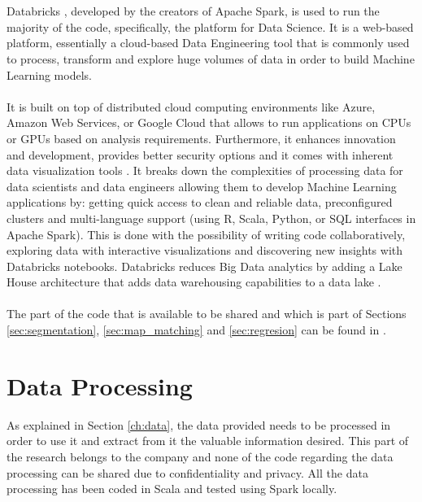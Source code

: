 \\
\\
Databricks \cite{databricks1}, developed by the creators of Apache Spark, is used to run the majority of the code, specifically, the platform for Data Science. It is a web-based platform, essentially a cloud-based Data Engineering tool that is commonly used to process, transform and explore huge volumes of data in order to build Machine Learning models.  
\\
\\
It is built on top of distributed cloud computing environments like Azure, Amazon Web Services, or Google Cloud that allows to run applications on CPUs or GPUs based on analysis requirements. Furthermore, it enhances innovation and development, provides better security options and it comes with inherent data visualization tools \cite{databricks2}.
It breaks down the complexities of processing data for data scientists and data engineers allowing them to develop Machine Learning applications by: getting quick access to clean and reliable data, preconfigured clusters and multi-language support (using R, Scala, Python, or SQL interfaces in Apache Spark). This is done with the possibility of writing code collaboratively, exploring data with interactive visualizations and discovering new insights with Databricks notebooks. 
Databricks reduces Big Data analytics by adding a Lake House architecture that adds data warehousing capabilities to a data lake \cite{databricks3}.
\\
\\ 
The part of the code that is available to be shared and which is part of Sections \ref{sec:segmentation}, \ref{sec:map_matching} and \ref{sec:regresion} can be found in \cite{git}.


\section{Data Processing}
\label{sec:data_processing}
As explained in Section \ref{ch:data}, the data provided needs to be processed in order to use it and extract from it the valuable information desired. This part of the research belongs to the company and none of the code regarding the data processing can be shared due to confidentiality and privacy. All the data processing has been coded in Scala and tested using Spark locally. 
